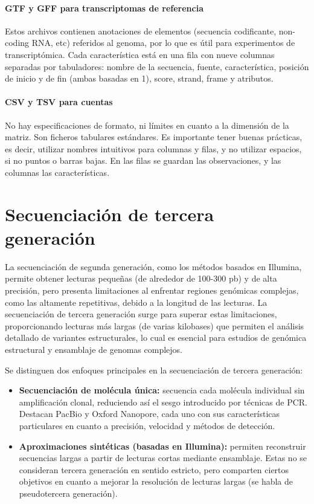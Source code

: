 \paragraph{GTF y GFF para transcriptomas de referencia} 
Estos archivos contienen anotaciones de elementos (secuencia codificante, non-coding RNA, etc) referidos al genoma, por lo que es útil para experimentos de transcriptómica. Cada característica está en una fila con nueve columnas separadas por tabuladores: nombre de la secuencia, fuente, característica, posición de inicio y de fin (ambas basadas en 1), score, strand, frame y atributos. 

\paragraph{CSV y TSV para cuentas}
No hay especificaciones de formato, ni límites en cuanto a la dimensión de la matriz. Son ficheros tabulares estándares. Es importante tener buenas prácticas, es decir, utilizar nombres intuitivos para columnas y filas, y no utilizar espacios, si no puntos o barras bajas. En las filas se guardan las observaciones, y las columnas las características. 

\section{Secuenciación de tercera generación}
La secuenciación de segunda generación, como los métodos basados en Illumina, permite obtener lecturas pequeñas (de alrededor de 100-300 pb) y de alta precisión, pero presenta limitaciones al enfrentar regiones genómicas complejas, como las altamente repetitivas, debido a la longitud de las lecturas. La secuenciación de tercera generación surge para superar estas limitaciones, proporcionando lecturas más largas (de varias kilobases) que permiten el análisis detallado de variantes estructurales, lo cual es esencial para estudios de genómica estructural y ensamblaje de genomas complejos.

Se distinguen dos enfoques principales en la secuenciación de tercera generación:
\begin{itemize}
\item \textbf{Secuenciación de molécula única:} secuencia cada molécula individual sin amplificación clonal, reduciendo así el sesgo introducido por técnicas de PCR. Destacan PacBio y Oxford Nanopore, cada uno con sus características particulares en cuanto a precisión, velocidad y métodos de detección.
\item \textbf{Aproximaciones sintéticas (basadas en Illumina):} permiten reconstruir secuencias largas a partir de lecturas cortas mediante ensamblaje. Estas no se consideran tercera generación en sentido estricto, pero comparten ciertos objetivos en cuanto a mejorar la resolución de lecturas largas (se habla de pseudotercera generación).
\end{itemize}

